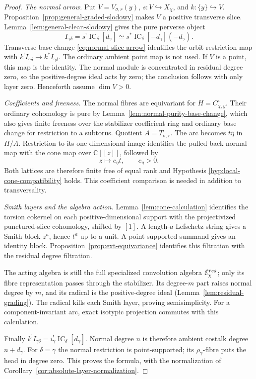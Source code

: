 \documentclass[10pt,a4paper]{amsart}
\newcommand{\IC}{\operatorname{IC}}
\begin{document}
\begin{proof}
\emph{The normal arrow.}
Put $V=V_{\sigma,r}(y)$, $s:V\hookrightarrow X_\chi$, and
$k:\{y\}\hookrightarrow V$.  Proposition~\ref{prop:general-graded-slodowy}
makes $V$ a positive transverse slice.
Lemma~\ref{lem:general-clean-slodowy} gives the pure perverse object
\[
 I_{\gamma\delta}=s^!\IC_\delta[d_\gamma]
 \simeq s^*\IC_\delta[-d_\gamma](-d_\gamma).
\]
Transverse base change \eqref{eq:normal-slice-arrow} identifies the
orbit-restriction map with $k^!I_{\gamma\delta}\to k^*I_{\gamma\delta}$.
The ordinary ambient point map is not used.
If $V$ is a point, this map is the identity.  The normal module is
concentrated in residual degree zero, so the positive-degree ideal acts
by zero; the conclusion follows with only layer zero.  Henceforth
assume $\dim V>0$.

\smallskip
\emph{Coefficients and freeness.}
The normal fibres are equivariant for $H=C_{\chi,y}^\circ$.
Their ordinary cohomology is pure by
Lemma~\ref{lem:normal-purity-base-change}, which also gives finite
freeness over the stabilizer coefficient ring and ordinary base change
for restriction to a subtorus.  Quotient $A=T_{\sigma,r}$.
The arc becomes $t\bar\eta$ in $H/A$.  Restriction to its one-dimensional
image identifies the pulled-back normal map with the cone map over
$\mathbb C[[z]]$, followed by
\[
 z\longmapsto c_\eta t,\qquad c_\eta>0.
\]
Both lattices are therefore finite free of equal rank and Hypothesis
\ref{hyp:local-cone-compatibility} holds.  This coefficient comparison
is needed in addition to transversality.

\smallskip
\emph{Smith layers and the algebra action.}
Lemma~\ref{lem:cone-calculation} identifies the torsion cokernel on each
positive-dimensional support with the projectivized punctured-slice
cohomology, shifted by $[1]$.  A length-$a$ Lefschetz string gives a
Smith block $z^a$, hence $t^a$ up to a unit.  A point-supported summand
gives an identity block.  Proposition~\ref{prop:ext-equivariance}
identifies this filtration with the residual degree filtration.

The acting algebra is still the full specialized convolution algebra
$\mathcal E_\chi^{\rm res}$; only its fibre representation passes
through the stabilizer.  Its degree-$m$ part raises normal degree by
$m$, and its radical is the positive-degree ideal
(Lemma~\ref{lem:residual-grading}).  The radical kills each Smith
layer, proving semisimplicity.  For a component-invariant arc, exact
isotypic projection commutes with this calculation.

Finally $k^!I_{\gamma\delta}=i_\gamma^!\IC_\delta[d_\gamma]$.
Normal degree $n$ is therefore ambient costalk degree $n+d_\gamma$.
For $\delta=\gamma$ the normal restriction is point-supported; its
$\rho_\gamma$-fibre puts the head in degree zero.  This proves the
formula, with the normalization of
Corollary~\ref{cor:absolute-layer-normalization}.
\end{proof}
\end{document}
